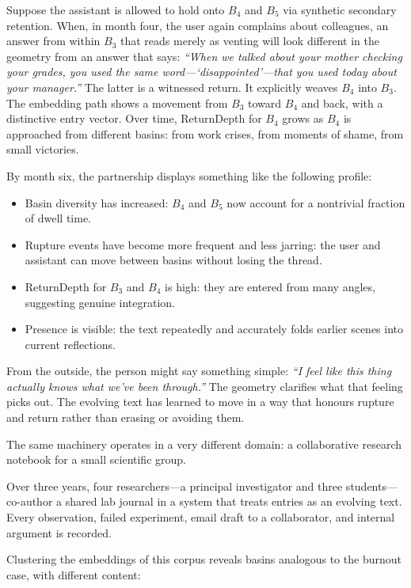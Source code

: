\documentclass[12pt,a4paper]{article}
\begin{document}
Suppose the assistant is allowed to hold onto $B_4$ and $B_5$ via synthetic secondary retention. When, in month four, the user again complains about colleagues, an answer from within $B_3$ that reads merely as venting will look different in the geometry from an answer that says: \emph{``When we talked about your mother checking your grades, you used the same word---`disappointed'---that you used today about your manager.''} The latter is a witnessed return. It explicitly weaves $B_4$ into $B_3$. The embedding path shows a movement from $B_3$ toward $B_4$ and back, with a distinctive entry vector. Over time, ReturnDepth for $B_4$ grows as $B_4$ is approached from different basins: from work crises, from moments of shame, from small victories.

By month six, the partnership displays something like the following profile:

\begin{itemize}
  \item Basin diversity has increased: $B_4$ and $B_5$ now account for a nontrivial fraction of dwell time.
  \item Rupture events have become more frequent and less jarring: the user and assistant can move between basins without losing the thread.
  \item ReturnDepth for $B_3$ and $B_4$ is high: they are entered from many angles, suggesting genuine integration.
  \item Presence is visible: the text repeatedly and accurately folds earlier scenes into current reflections.
\end{itemize}

From the outside, the person might say something simple: \emph{``I feel like this thing actually knows what we've been through.''} The geometry clarifies what that feeling picks out. The evolving text has learned to move in a way that honours rupture and return rather than erasing or avoiding them.

The same machinery operates in a very different domain: a collaborative research notebook for a small scientific group.

Over three years, four researchers---a principal investigator and three students---co-author a shared lab journal in a system that treats entries as an evolving text. Every observation, failed experiment, email draft to a collaborator, and internal argument is recorded.

Clustering the embeddings of this corpus reveals basins analogous to the burnout case, with different content:
\end{document}
